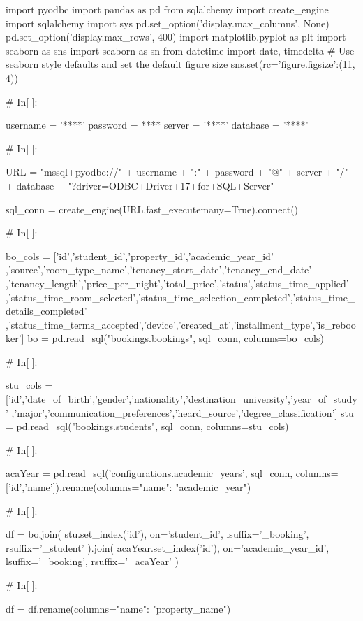\begin{python}

import pyodbc
import pandas as pd
from sqlalchemy import create_engine
import sqlalchemy
import sys
pd.set_option('display.max_columns', None)
pd.set_option('display.max_rows', 400)
import matplotlib.pyplot as plt
import seaborn as sns
import seaborn as sn
from datetime import date, timedelta
# Use seaborn style defaults and set the default figure size
sns.set(rc={'figure.figsize':(11, 4)})


# In[ ]:


username = '****'
password = ****
server = '****'
database = '****'


# In[ ]:


URL = "mssql+pyodbc://" + username + ":" + password + "@" + server + "/" + database + "?driver=ODBC+Driver+17+for+SQL+Server"

sql_conn = create_engine(URL,fast_executemany=True).connect()


# In[ ]:


bo_cols = ['id','student_id','property_id','academic_year_id'
           ,'source','room_type_name','tenancy_start_date','tenancy_end_date'
           ,'tenancy_length','price_per_night','total_price','status','status_time_applied'
           ,'status_time_room_selected','status_time_selection_completed','status_time_details_completed'
           ,'status_time_terms_accepted','device','created_at','installment_type','is_rebooker']
bo = pd.read_sql("bookings.bookings", sql_conn, columns=bo_cols)


# In[ ]:


stu_cols = ['id','date_of_birth','gender','nationality','destination_university','year_of_study'
            ,'major','communication_preferences','heard_source','degree_classification']
stu = pd.read_sql("bookings.students", sql_conn, columns=stu_cols)


# In[ ]:


acaYear = pd.read_sql('configurations.academic_years', sql_conn, columns=['id','name']).rename(columns={"name": "academic_year"})


# In[ ]:


df = bo.join(
    stu.set_index('id'), on='student_id', lsuffix='_booking', rsuffix='_student'
).join(
    acaYear.set_index('id'), on='academic_year_id', lsuffix='_booking', rsuffix='_acaYear'
)


# In[ ]:


df = df.rename(columns={"name": "property_name"})



\end{python}
